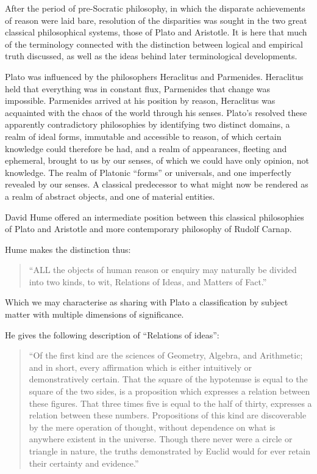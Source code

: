 \documentclass[10pt,titlepage]{article}
\begin{document}
After the period of pre-Socratic philosophy, in which the disparate achievements of reason were laid bare, resolution of the disparities was sought in the two great classical philosophical systems, those of Plato and Aristotle.
It is here that much of the terminology connected with the distinction between logical and empirical truth discussed, as well as the ideas behind later terminological developments.

Plato was influenced by the philosophers Heraclitus and Parmenides.
Heraclitus held that everything was in constant flux, Parmenides that change was impossible.
Parmenides arrived at his position by reason, Heraclitus was acquainted with the chaos of the world through his senses.
Plato's resolved these apparently contradictory philosophies by identifying two distinct domains, a realm of ideal forms, immutable and accessible to reason, of which certain knowledge could therefore be had, and a realm of appearances, fleeting and ephemeral, brought to us by our senses, of which we could have only opinion, not knowledge.
The realm of Platonic ``forms'' or universals, and one imperfectly revealed by our senses.
A classical predecessor to what might now be rendered as a realm of abstract objects, and one of material entities.

David Hume offered an intermediate position between this classical philosophies of Plato and Aristotle and more contemporary philosophy of Rudolf Carnap.

Hume makes the distinction thus:

\begin{quote}
``ALL the objects of human reason or enquiry may naturally be divided
  into two kinds, to wit, Relations of Ideas, and Matters of Fact.'' 
\end{quote}

Which we may characterise as sharing with Plato a classification by subject matter with multiple dimensions of significance.

He gives the following description of ``Relations of ideas'':

\begin{quote}
``Of the first kind are the sciences of Geometry, Algebra, and
Arithmetic; and in short, every affirmation which is either
intuitively or demonstratively certain.
That the square of the hypotenuse is equal to the square of the two
sides, is a proposition which expresses a relation between these
figures.
That three times five is equal to the half of thirty, expresses a
relation between these numbers.
Propositions of this kind are discoverable by the mere operation of
thought, without dependence on what is anywhere existent in the
universe.
Though there never were a circle or triangle in nature, the truths
demonstrated by Euclid would for ever retain their certainty and
evidence.''
\end{quote}
\end{document}
